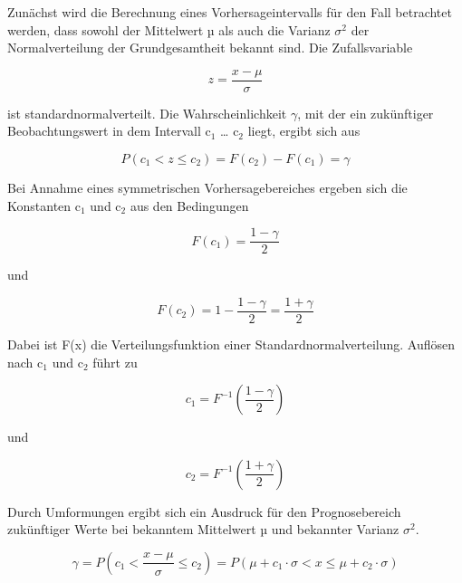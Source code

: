 \noindent Zun\"{a}chst wird die Berechnung eines Vorhersageintervalls f\"{u}r den Fall betrachtet werden, dass sowohl der Mittelwert µ als auch die Varianz $\sigma^{2}$ der Normalverteilung der Grundgesamtheit bekannt sind. Die Zufallsvariable 

\begin{equation}\label{eq:fivehundredthirteen}
z=\dfrac{x-\mu}{\sigma}
\end{equation}

\noindent ist standardnormalverteilt. Die Wahrscheinlichkeit $\gamma$, mit der ein zuk\"{u}nftiger Beobachtungswert in dem Intervall c$_{1}$ {\dots} c$_{2}$ liegt, ergibt sich aus 

\begin{equation}\label{eq:fivehundredfourteen}
P\left(c_{1} <z\le c_{2} \right)=F\left(c_{2} \right)-F\left(c_{1} \right)=\gamma
\end{equation}

\noindent Bei Annahme eines symmetrischen Vorhersagebereiches ergeben sich die Konstanten c$_{1}$ und c$_{2}$ aus den Bedingungen

\begin{equation}\label{eq:fivehundredfifteen}
F(c_{1})=\dfrac{1-\gamma}{2}
\end{equation}

\noindent und 

\begin{equation}\label{eq:fivehundredsixteen}
F(c_{2})=1-\dfrac{1-\gamma}{2} =\dfrac{1+\gamma}{2}
\end{equation}

\noindent Dabei ist F(x) die Verteilungsfunktion einer Standardnormalverteilung. Aufl\"{o}sen nach c$_{1}$ und c$_{2}$ f\"{u}hrt zu

\begin{equation}\label{eq:fivehundredseventeen}
c_{1} =F^{-1} \left(\dfrac{1-\gamma}{2} \right)
\end{equation}

\noindent und

\begin{equation}\label{eq:fivehundredeighteen}
c_{2} =F^{-1} \left(\dfrac{1+\gamma}{2} \right)
\end{equation}

\noindent Durch Umformungen ergibt sich ein Ausdruck f\"{u}r den Prognosebereich zuk\"{u}nftiger Werte bei bekanntem Mittelwert µ und bekannter Varianz $\sigma$${}^{2}$.

\begin{equation}\label{eq:fivehundrednineteen}
\gamma =P\left(c_{1} <\dfrac{x-\mu }{\sigma } \le c_{2} \right)=P\left(\mu +c_{1} \cdot \sigma <x\le \mu +c_{2} \cdot \sigma \right)
\end{equation}

